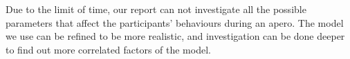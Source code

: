 \documentclass[11pt]{article}
\begin{document}
Due to the limit of time, our report can not investigate all the possible parameters that affect the participants' behaviours during an apero. The model we use can be refined to be more realistic, and investigation can be done deeper to find out more correlated factors of the model.




\end{document}
